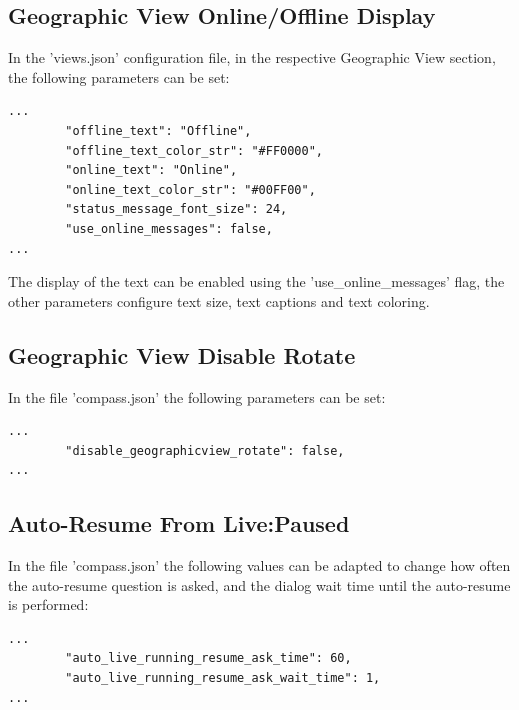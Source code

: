 \subsection{Geographic View Online/Offline Display}
\label{sec:live_online_offline}

In the 'views.json' configuration file, in the respective Geographic View section, the following parameters can be set:

\begin{lstlisting}
...
        "offline_text": "Offline",
        "offline_text_color_str": "#FF0000",
        "online_text": "Online",
        "online_text_color_str": "#00FF00",
        "status_message_font_size": 24,
        "use_online_messages": false,        
...        
\end{lstlisting}

The display of the text can be enabled using the 'use\_online\_messages' flag, the other parameters configure text size, text captions and text coloring.

\subsection{Geographic View Disable Rotate}

In the file 'compass.json' the following parameters can be set:

\begin{lstlisting}
...
        "disable_geographicview_rotate": false,
...        
\end{lstlisting}

\subsection{Auto-Resume From Live:Paused}
\label{sec:live_paused_resume}

In the file 'compass.json' the following values can be adapted to change how often the auto-resume question is asked, and the dialog wait time until the auto-resume is performed:

\begin{lstlisting}
...
        "auto_live_running_resume_ask_time": 60,
        "auto_live_running_resume_ask_wait_time": 1,
...        
\end{lstlisting}


